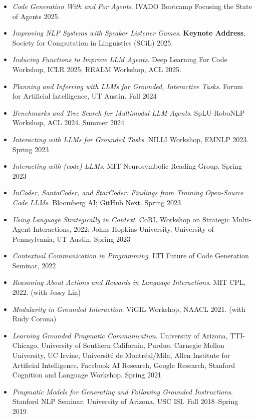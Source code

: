 \begin{itemize}[leftmargin=-0.4mm,partopsep=0pt,label=]
\item \emph{Code Generation With and For Agents}. IVADO Bootcamp Focusing the State of Agents 2025.
\item \emph{Improving NLP Systems with Speaker Listener Games}. \textbf{Keynote Address}, Society for Computation in Linguistics (SCiL) 2025.
\item \emph{Inducing Functions to Improve LLM Agents}. Deep Learning For Code Workshop, ICLR 2025; REALM Workshop, ACL 2025.
\item \emph{Planning and Inferring with LLMs for Grounded, Interactive Tasks}. Forum for Artificial Intelligence, UT Austin. Fall 2024
\item \emph{Benchmarks and Tree Search for Multimodal LLM Agents}. SpLU-RoboNLP Workshop, ACL 2024. Summer 2024
\item \emph{Interacting with LLMs for Grounded Tasks}. NILLI Workshop, EMNLP 2023. Spring 2023
\item \emph{Interacting with (code) LLMs}. MIT Neurosymbolic Reading Group. Spring 2023
\item \emph{InCoder, SantaCoder, and StarCoder: Findings from Training Open-Source Code LLMs}. Bloomberg AI; GitHub Next. Spring 2023
\item \emph{Using Language Strategically in Context}. CoRL Workshop on Strategic Multi-Agent Interactions, 2022; Johns Hopkins University, University of Pennsylvania, UT Austin. Spring 2023
\item \emph{Contextual Communication in Programming}. LTI Future of Code Generation Seminar, 2022
\item \emph{Reasoning About Actions and Rewards in Language Interactions}. MIT CPL, 2022. (with Jessy Lin)
\item \emph{Modularity in Grounded Interaction}. ViGIL Workshop, NAACL 2021. (with Rudy Corona)
\item \emph{Learning Grounded Pragmatic Communication}. University of Arizona, TTI-Chicago, University of Southern California, Purdue, Carnegie Mellon University, UC Irvine, Université de Montréal/Mila, Allen Institute for Artificial Intelligence, Facebook AI Research, Google Research, Stanford Cognition and Language Workshop. Spring 2021
\item \emph{Pragmatic Models for Generating and Following Grounded Instructions}. Stanford NLP Seminar, University of Arizona, USC ISI. Fall 2018--Spring 2019
\end{itemize}
